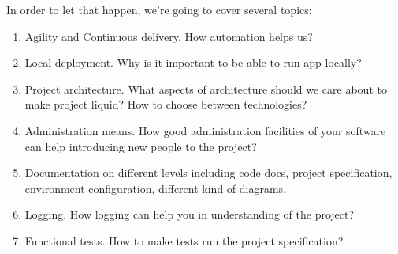 \documentclass[11pt,a4paper,oneside]{article}
\begin{document}
In order to let that happen, we're going to cover several topics:
\begin{enumerate}
 \item Agility and Continuous delivery. How automation helps us?
 \item Local deployment. Why is it important to be able to run app locally?
 \item Project architecture. What aspects of architecture should we care about to make project liquid? How to choose between technologies?
 \item Administration means. How good administration facilities of your software can help introducing new people to the project?
 \item Documentation on different levels including code docs, project specification, environment configuration, different kind of diagrams.
 \item Logging. How logging can help you in understanding of the project?
 \item Functional tests. How to make tests run the project specification?
\end{enumerate}
\end{document}
